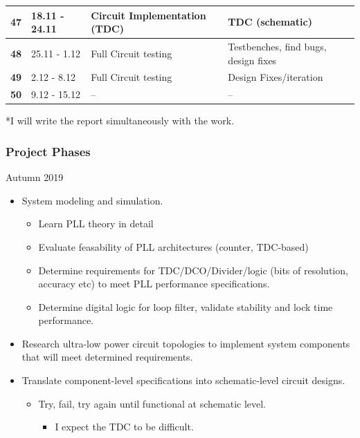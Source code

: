 \documentclass[t, screen, aspectratio=43]{beamer}
\begin{document}
\begin{frame}
\begin{table}[htb!]
\begin{tabular}{|l|l|l|l|}
			\hline 
			\rule[-1ex]{0pt}{2.5ex} \textbf{47}& 18.11 - 24.11& Circuit Implementation (TDC)& TDC (schematic)\\ 
			\hline 
			\rule[-1ex]{0pt}{2.5ex} \textbf{48}& 25.11 - 1.12& Full Circuit testing & Testbenches, find bugs, design fixes\\ 
			\hline 
			\rule[-1ex]{0pt}{2.5ex} \textbf{49}& 2.12 - 8.12& Full Circuit testing& Design Fixes/iteration\\ 
			\hline 
			\rule[-1ex]{0pt}{2.5ex} \textbf{50}& 9.12 - 15.12& --& --\\ 
			\hline 
		\end{tabular}
		\begin{flushleft}*I will write the report simultaneously with the work.
		\end{flushleft}
	\end{table}   
\end{frame}



\begin{frame}
	\frametitle{Project Phases}
	\begin{block}{Autumn 2019}
		\footnotesize
		\begin{itemize}
			\item System modeling and simulation.
			\begin{itemize}
				\footnotesize
				\item Learn PLL theory in detail
				\item Evaluate feasability of PLL architectures (counter, TDC-based)
				\item Determine requirements for TDC/DCO/Divider/logic (bits of resolution, accuracy etc) to meet PLL performance specifications.
				\item Determine digital logic for loop filter, validate stability and lock time performance.
			\end{itemize}
			\item Research ultra-low power circuit topologies to implement system components that will meet determined requirements.
			\item Translate component-level specifications into schematic-level circuit designs.
			\begin{itemize}
				\footnotesize
				\item Try, fail, try again until functional at schematic level.
				\begin{itemize}
					\footnotesize
					\item I expect the TDC to be difficult.
				\end{itemize}
			\end{itemize}      
		\end{itemize}
	\end{block}
\end{frame}
\end{document}
